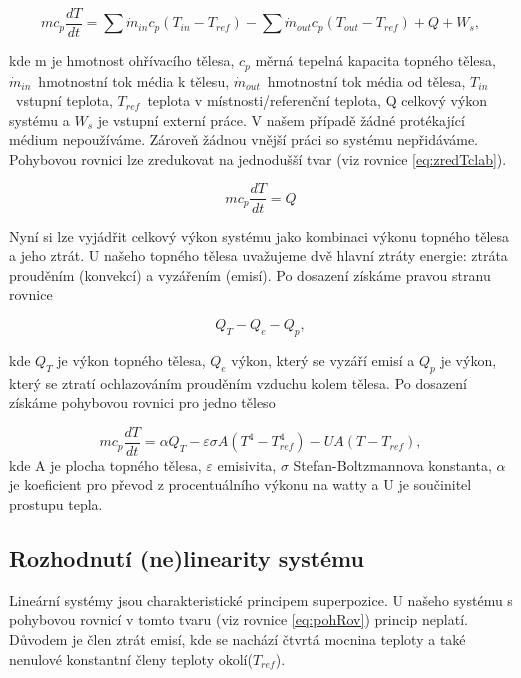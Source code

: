 \documentclass[12pt]{article} %
\begin{document}
\begin{equation}
    \label{eq:tclab}
    m c_p \frac{dT}{dt} = \sum \dot{m}_{in} c_p (T_{in} - T_{ref}) - \sum \dot{m}_{out} c_p (T_{out} - T_{ref}) + Q + W_s,
\end{equation}

kde m je hmotnost ohřívacího tělesa, $c_p$ měrná tepelná kapacita topného tělesa, $\dot{m}_{in}$~hmotnostní tok média k tělesu, $\dot{m}_{out}$~hmotnostní tok média od tělesa, $T_{in}$~vstupní teplota, $T_{ref}$~teplota v místnosti/referenční teplota, Q celkový výkon systému a $W_s$ je vstupní externí práce. V našem případě žádné protékající médium nepoužíváme. Zároveň žádnou vnější práci so systému nepřidáváme. Pohybovou rovnici lze zredukovat na jednodušší tvar (viz rovnice \ref{eq:zredTclab}).

\begin{equation}
    \label{eq:zredTclab}
    m c_p \frac{dT}{dt} = Q 
\end{equation}

Nyní si lze vyjádřit celkový výkon systému jako kombinaci výkonu topného tělesa a jeho ztrát.
U našeho topného tělesa uvažujeme dvě hlavní ztráty energie: ztráta prouděním (konvekcí) a vyzářením (emisí). Po dosazení získáme pravou stranu rovnice

\begin{equation}
    \label{eq:pravStranaZredTclab}
    Q_T - Q_e - Q_p,
\end{equation}

kde $Q_T$ je výkon topného tělesa, $Q_e$ výkon, který se vyzáří emisí a $Q_p$ je výkon, který se ztratí ochlazováním prouděním vzduchu kolem tělesa. Po dosazení získáme pohybovou rovnici pro jedno těleso

\begin{equation}
    \label{eq:pohRov}
    m c_p \frac{dT}{dt} =  \alpha Q_T - \varepsilon \sigma A (T^4 - T_{ref}^4) - U A (T - T_{ref}),
\end{equation}
kde A je plocha topného tělesa, $\varepsilon$ emisivita, $\sigma$ Stefan-Boltzmannova konstanta, $\alpha$ je koeficient pro převod z procentuálního výkonu na watty a U je součinitel prostupu tepla.
\subsection{Rozhodnutí (ne)linearity systému}
Lineární systémy jsou charakteristické principem superpozice. U našeho systému s pohybovou rovnicí v tomto tvaru (viz rovnice \ref{eq:pohRov}) princip neplatí. Důvodem je člen ztrát emisí, kde se nachází čtvrtá mocnina teploty a také nenulové konstantní členy teploty okolí($T_{ref}$).
\end{document}
